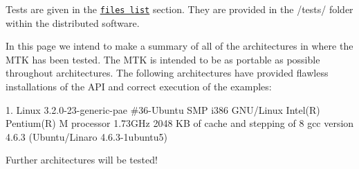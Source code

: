 Tests are given in the \href{files.html}{\tt files list} section. They are provided in the /tests/ folder within the distributed software.

In this page we intend to make a summary of all of the architectures in where the M\-T\-K has been tested. The M\-T\-K is intended to be as portable as possible throughout architectures. The following architectures have provided flawless installations of the A\-P\-I and correct execution of the examples\-:


\begin{DoxyPre}
1. Linux 3.2.0-23-generic-pae \#36-Ubuntu SMP i386 GNU/Linux
   Intel(R) Pentium(R) M processor 1.73GHz 2048 KB of cache and stepping of 8
   gcc version 4.6.3 (Ubuntu/Linaro 4.6.3-1ubuntu5)
\end{DoxyPre}


Further architectures will be tested! 